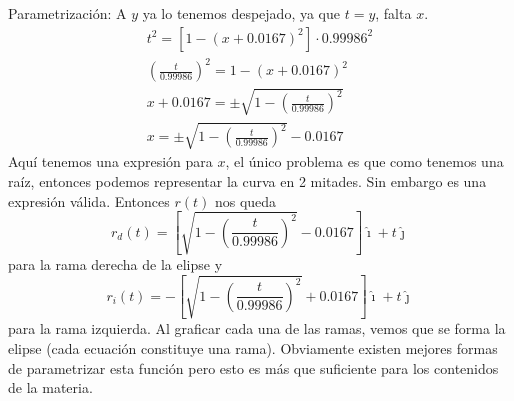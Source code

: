 \begin{example}{Parametrización:}
  A $y$ ya lo tenemos despejado, ya que $t=y$, falta $x$.
  \begin{gather*}
  t^2 = \left[1 - (x + 0.0167)^2\right]\cdot 0.99986^2 \\
  \left(\frac{t}{0.99986}\right)^2 = 1 - (x + 0.0167)^2 \\
  x+0.0167 = \pm\sqrt{1-\left(\frac{t}{0.99986}\right)^2} \\
  x = \pm\sqrt{1-\left(\frac{t}{0.99986}\right)^2} - 0.0167
  \end{gather*}
  Aquí tenemos una expresión para $x$, el único problema es que como tenemos una raíz, entonces podemos representar la curva en 2 mitades. Sin embargo es una expresión válida. Entonces $r(t)$ nos queda
  $$
  r_d(t)= \left[ \sqrt{1-\left(\frac{t}{0.99986}\right)^2} - 0.0167 \right]\hat{\imath} + t \hat{\jmath}
  $$
  para la rama derecha de la elipse y 
  $$
  r_i(t)= -\left[ \sqrt{1-\left(\frac{t}{0.99986}\right)^2} + 0.0167 \right]\hat{\imath} + t \hat{\jmath}
  $$
  para la rama izquierda. Al graficar cada una de las ramas, vemos que se forma la elipse (cada ecuación constituye una rama). Obviamente existen mejores formas de parametrizar esta función pero esto es más que suficiente para los contenidos de la materia.
\end{example}

